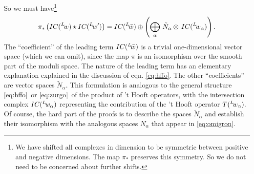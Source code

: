 So we must have\footnote{We have shifted all complexes in dimension to
be symmetric between positive and negative dimensions.  The map
$\pi_*$ preserves this symmetry.  So we do not need to be
concerned about further shifts.}
\setcounter{equation}{33}
\begin{equation}\label{eq:yrox}
\pi_*\left(IC({}^L\negthinspace w)\star
IC({}^L\negthinspace w')\right)=IC({}^L\negthinspace\bar
w)\oplus \left(\bigoplus_\alpha\, \tilde N_\alpha \otimes \,IC({}^L\negthinspace w_\alpha)\right).
\end{equation}
 The
``coefficient'' of the leading term $IC({}^L\negthinspace\bar w)$ is
a trivial one-dimensional vector space (which we can omit),
since the map $\pi$ is an isomorphism over the smooth part of
the moduli space. The nature of the leading term has an elementary
explanation explained in the discussion of eqn. \eqref{eq:hffo}. The other
``coefficients'' are vector spaces $\tilde N_\alpha$. This formulation is analogous to the
general structure \eqref{eq:hffo}\ or \eqref{eq:zurgo}\ of the product of 't Hooft
operators, with the intersection complex $IC({}^L\negthinspace
w_\alpha)$ representing the contribution of the 't Hooft operator
$T({}^L\negthinspace w_\alpha)$.  Of course, the hard part of the
proofs \cite{ref97,ref98} is to describe the spaces $\tilde N_\alpha$ and
establish their isomorphism with the analogous spaces $N_\alpha$ that appear in \eqref{eq:omigron}.
